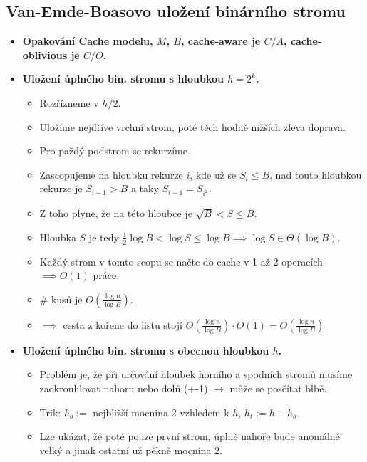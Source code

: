 \documentclass[11pt,a4paper]{article}
\begin{document}
\subsection{Van-Emde-Boasovo uložení binárního stromu}
\begin{itemize}
    \item \textbf{Opakování Cache modelu, $M$, $B$, cache-aware je $C/A$, cache-oblivious je $C/O$.}
    \item \textbf{Uložení úplného bin. stromu s hloubkou $h=2^k$.}
    \begin{itemize}
        \item Rozřízneme v $h/2$.
        \item Uložíme nejdříve vrchní strom, poté těch hodně nižších zleva doprava.
        \item Pro paždý podstrom se rekurzíme.
        \item Zascopujeme na hloubku rekurze $i$, kde už se $S_i \leq B$, nad touto hloubkou rekurze je $S_{i-1} > B$ a taky $S_{i-1} = S_{i^2}$.
        \item Z toho plyne, že na této hloubce je $\sqrt{B} < S \le B$.
        \item Hloubka $S$ je tedy $\frac{1}{2}\log B < \log S \le \log B \implies \log S \in \Theta(\log B)$.
        \item Každý strom v tomto scopu se načte do cache v 1 až 2 operacích $\implies O(1)$ práce.
        \item $\#$ kusů je $O(\frac{\log n}{\log B})$.
        \item $\implies$ cesta z kořene do listu stojí $O(\frac{\log n}{\log B}) \cdot O(1) = O(\frac{\log n}{\log B})$
    \end{itemize}
    \item \textbf{Uložení úplného bin. stromu s obecnou hloubkou $h$.}
    \begin{itemize}
        \item Problém je, že při určování hloubek horního a spodních stromů musíme zaokrouhlovat nahoru nebo dolů (+-1) $\rightarrow$ může se posčítat blbě.
        \item Trik: $h_b :=$ nejbližší mocnina 2 vzhledem k $h$, $h_t := h - h_b$.
        \item Lze ukázat, že poté pouze první strom, úplně nahoře bude anomálně velký a jinak ostatní už pěkně mocnina 2.
    \end{itemize}
\end{itemize}
\end{document}
